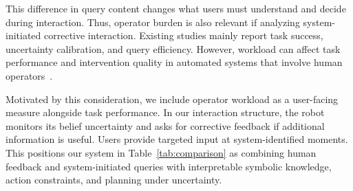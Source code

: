 This difference in query content changes what users must understand and decide during interaction. Thus, operator burden is also relevant if analyzing system-initiated corrective interaction. Existing studies mainly report task success, uncertainty calibration, and query efficiency. However, workload can affect task performance and intervention quality in automated systems that involve human operators~\cite{murata2000ergonomics,borragan2017cognitive,rajavenkatanarayanan2019towards}.


Motivated by this consideration, we include operator workload as a user-facing measure alongside task performance. In our interaction structure, the robot monitors its belief uncertainty and asks for corrective feedback if additional information is useful. Users provide targeted input at system-identified moments. This positions our system in Table~\ref{tab:comparison} as combining human feedback and system-initiated queries with interpretable symbolic knowledge, action constraints, and planning under uncertainty.
